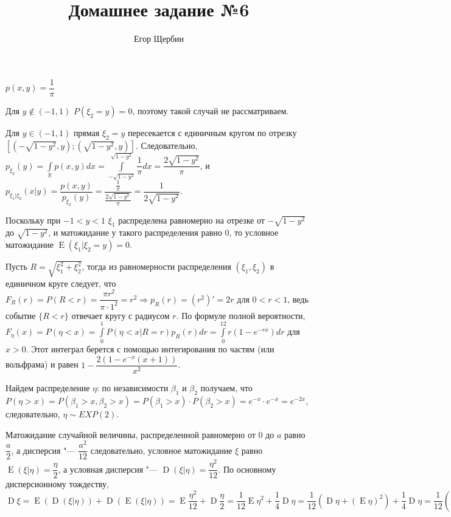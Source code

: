 \documentclass[12pt]{article}
\DeclareMathOperator{\E}{E}
\DeclareMathOperator{\D}{D}
\newenvironment{problem}[2][Задача]{\begin{trivlist}
\item[\hskip \labelsep {\bfseries #1}\hskip \labelsep {\bfseries #2.}]}{\end{trivlist}}
\begin{document}
 
 
\title{Домашнее задание №6}
\author{Егор Щербин}
\maketitle

\begin{problem}{1}
    \quad

    $p(x,y)=\dfrac1\pi$

    Для $y\not\in(-1,1)$ $P(\xi_2=y)=0$, поэтому такой случай не рассматриваем.
     
    Для $y\in(-1,1)$ прямая $\xi_2=y$ пересекается с единичным кругом по отрезку $[(-\sqrt{1-y^2},y);(\sqrt{1-y^2},y)]$.
    Следовательно, $p_{\xi_2}(y)=\int\limits_\mathbb{R}p(x,y)dx=\int\limits_{-\sqrt{1-y^2}}^{\sqrt{1-y^2}}\dfrac1\pi dx=
    \dfrac{2\sqrt{1-y^2}}\pi$, и $p_{\xi_1|\xi_2}(x|y)=\dfrac{p(x,y)}{p_{\xi_2}(y)}=
    \dfrac{\frac1\pi}{\frac{2\sqrt{1-y^2}}\pi}=\dfrac1{2\sqrt{1-y^2}}$. 
    
    Поскольку при $-1<y<1$ $\xi_1$ распределена равномерно на отрезке от $-\sqrt{1-y^2}$ до $\sqrt{1-y^2}$, и 
    матожидание у такого распределения равно 0,
    то условное матожидание $\E(\xi_1|\xi_2=y)=0$.
\end{problem}

\begin{problem}{2}
    \quad

    Пусть $R=\sqrt{\xi_1^2+\xi_2^2}$, тогда из равномерности распределения $(\xi_1,\xi_2)$ в единичном круге следует, 
    что $F_R(r)=P(R<r)=\dfrac{\pi r^2}{\pi\cdot1^2}=r^2\Rightarrow p_R(r)=(r^2)'=2r$ для $0<r<1$, ведь событие
    $\{R<r\}$ отвечает кругу с радиусом $r$. По формуле полной вероятности, $F_\eta(x)=P(\eta < x)=
    \int\limits_0^1P(\eta < x|R=r)p_R(r)dr=\int\limits_0^12r(1-e^{-rx})dr$ для $x>0$. Этот интеграл берется с помощью
    интегирования по частям (или вольфрама) и равен $1-\dfrac{2(1-e^{-x}(x+1))}{x^2}$.
\end{problem}

\begin{problem}{7}
    \quad

    Найдем распределение $\eta$: по независимости $\beta_1$ и $\beta_2$ получаем, что $P(\eta > x)=
    P(\beta_1>x,\beta_2>x)=P(\beta_1>x)\cdot P(\beta_2>x)=e^{-x}\cdot e^{-x}=e^{-2x}$, следовательно, 
    $\eta\sim EXP(2)$.

    Матожидание случайной величины, распределенной равномерно от 0 до $a$ равно $\dfrac a2$, а дисперсия "--- 
    $\dfrac{a^2}{12}$ следовательно, условное матожидание $\xi$ равно $\E(\xi|\eta)=\dfrac\eta2$, а условная дисперсия
    "--- $\D(\xi|\eta)=\dfrac{\eta^2}{12}$. По основному дисперсионному тождеству,
    $\D\xi=\E(\D(\xi|\eta))+\D(\E(\xi|\eta))=
    \E\dfrac{\eta^2}{12}+\D\dfrac\eta2=\dfrac1{12}\E\eta^2+\dfrac14\D\eta=\dfrac1{12}(\D\eta+(\E\eta)^2)+\dfrac14\D\eta=
    \dfrac1{12}(\dfrac14+\dfrac14)+\dfrac14\cdot\dfrac14=\dfrac5{48}$
\end{problem}
\end{document}
